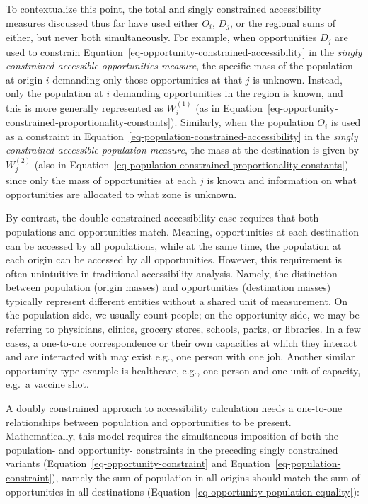 \documentclass[
]{article}
\begin{document}
To contextualize this point, the total and singly constrained
accessibility measures discussed thus far have used either \(O_i\),
\(D_j\), or the regional sums of either, but never both simultaneously.
For example, when opportunities \(D_j\) are used to constrain
Equation~\ref{eq-opportunity-constrained-accessibility} in the
\emph{singly constrained accessible opportunities measure}, the specific
mass of the population at origin \(i\) demanding only those
opportunities at that \(j\) is unknown. Instead, only the population at
\(i\) demanding opportunities in the region is known, and this is more
generally represented as \(W_i^{(1)}\) (as in
Equation~\ref{eq-opportunity-constrained-proportionality-constants}).
Similarly, when the population \(O_i\) is used as a constraint in
Equation~\ref{eq-population-constrained-accessibility} in the
\emph{singly constrained accessible population measure}, the mass at the
destination is given by \(W_j^{(2)}\) (also in
Equation~\ref{eq-population-constrained-proportionality-constants})
since only the mass of opportunities at each \(j\) is known and
information on what opportunities are allocated to what zone is unknown.

By contrast, the double-constrained accessibility case requires that
both populations and opportunities match. Meaning, opportunities at each
destination can be accessed by all populations, while at the same time,
the population at each origin can be accessed by all opportunities.
However, this requirement is often unintuitive in traditional
accessibility analysis. Namely, the distinction between population
(origin masses) and opportunities (destination masses) typically
represent different entities without a shared unit of measurement. On
the population side, we usually count people; on the opportunity side,
we may be referring to physicians, clinics, grocery stores, schools,
parks, or libraries. In a few cases, a one-to-one correspondence or
their own capacities at which they interact and are interacted with may
exist e.g., one person with one job. Another similar opportunity type
example is healthcare, e.g., one person and one unit of capacity, e.g.~a
vaccine shot.

A doubly constrained approach to accessibility calculation needs a
one-to-one relationships between population and opportunities to be
present. Mathematically, this model requires the simultaneous imposition
of both the population- and opportunity- constraints in the preceding
singly constrained variants (Equation~\ref{eq-opportunity-constraint}
and Equation~\ref{eq-population-constraint}), namely the sum of
population in all origins should match the sum of opportunities in all
destinations (Equation~\ref{eq-opportunity-population-equality}):
\end{document}

